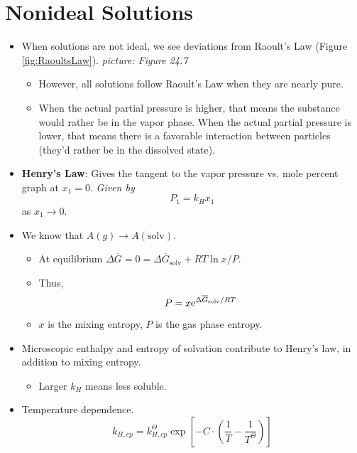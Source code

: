 \documentclass[../notes.tex]{subfiles}
\begin{document}
\section{Nonideal Solutions}
\begin{itemize}
    \item {}When solutions are not ideal, we see deviations from Raoult's Law (Figure \ref{fig:RaoultsLaw}).
    \emph{picture: Figure 24.7}
    \begin{itemize}
        \item However, all solutions follow Raoult's Law when they are nearly pure.
        \item When the actual partial pressure is higher, that means the substance would rather be in the vapor phase. When the actual partial pressure is lower, that means there is a favorable interaction between particles (they'd rather be in the dissolved state).
    \end{itemize}
    \item \textbf{Henry's Law}: Gives the tangent to the vapor pressure vs. mole percent graph at $x_1=0$. \emph{Given by}
    \begin{equation*}
        P_1 = k_Hx_1
    \end{equation*}
    as $x_1\to 0$.
    \item We know that $A(g)\to A(\text{solv})$.
    \begin{itemize}
        \item At equilibrium $\Delta\overline{G}=0=\Delta\overline{G}_\text{solv}+RT\ln x/P$.
        \item Thus,
        \begin{equation*}
            P = x\e[\Delta\overline{G}_\text{solv}/RT]
        \end{equation*}
        \item $x$ is the mixing entropy, $P$ is the gas phase entropy.
    \end{itemize}
    \item Microscopic enthalpy and entropy of solvation contribute to Henry's law, in addition to mixing entropy.
    \begin{itemize}
        \item Larger $k_H$ means less soluble.
    \end{itemize}
    \item Temperature dependence.
    \begin{equation*}
        k_{H,cp} = k_{H,cp}^\Theta\exp\left[ -C\cdot\left( \frac{1}{T}-\frac{1}{T^\Theta} \right) \right]

\end{equation*}
\end{itemize}
\end{document}
